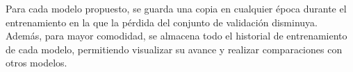 Para cada modelo propuesto, se guarda una copia en cualquier época durante el entrenamiento en la que la pérdida del conjunto de validación disminuya. Además, para mayor comodidad, se almacena todo el historial de entrenamiento de cada modelo, permitiendo visualizar su avance y realizar comparaciones con otros modelos.

